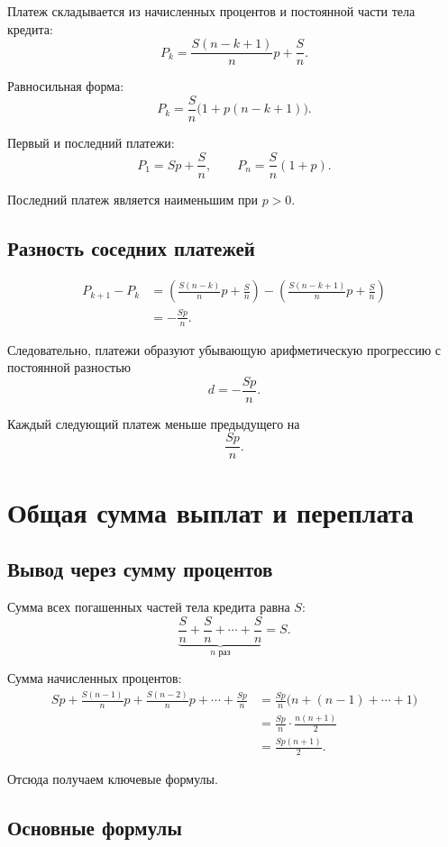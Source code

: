 \documentclass[a4paper,12pt]{article}
\begin{document}
Платеж складывается из начисленных процентов и постоянной части тела
кредита:
\[
\boxed{
P_k=
\frac{S(n-k+1)}{n}p+\frac{S}{n}
}.
\]

Равносильная форма:
\[
P_k=
\frac{S}{n}\bigl(1+p(n-k+1)\bigr).
\]

Первый и последний платежи:
\[
\boxed{P_1=Sp+\frac{S}{n}},
\qquad
\boxed{P_n=\frac{S}{n}(1+p)}.
\]

Последний платеж является наименьшим при $p>0$.

\subsection{Разность соседних платежей}

\begin{align*}
P_{k+1}-P_k
&=
\left(
\frac{S(n-k)}{n}p+\frac{S}{n}
\right)
-
\left(
\frac{S(n-k+1)}{n}p+\frac{S}{n}
\right)
\\
&=
-\frac{Sp}{n}.
\end{align*}

Следовательно, платежи образуют убывающую арифметическую прогрессию
с постоянной разностью
\[
\boxed{d=-\frac{Sp}{n}}.
\]

Каждый следующий платеж меньше предыдущего на
\[
\boxed{\frac{Sp}{n}}.
\]

\section{Общая сумма выплат и переплата}

\subsection{Вывод через сумму процентов}

Сумма всех погашенных частей тела кредита равна $S$:
\[
\underbrace{
\frac{S}{n}+\frac{S}{n}+\cdots+\frac{S}{n}
}_{n\text{ раз}}
=
S.
\]

Сумма начисленных процентов:
\begin{align*}
Sp
+\frac{S(n-1)}{n}p
+\frac{S(n-2)}{n}p
+\cdots
+\frac{Sp}{n}
&=
\frac{Sp}{n}
\bigl(n+(n-1)+\cdots+1\bigr)
\\
&=
\frac{Sp}{n}\cdot\frac{n(n+1)}{2}
\\
&=
\frac{Sp(n+1)}{2}.
\end{align*}

Отсюда получаем ключевые формулы.

\subsection{Основные формулы}
\end{document}
